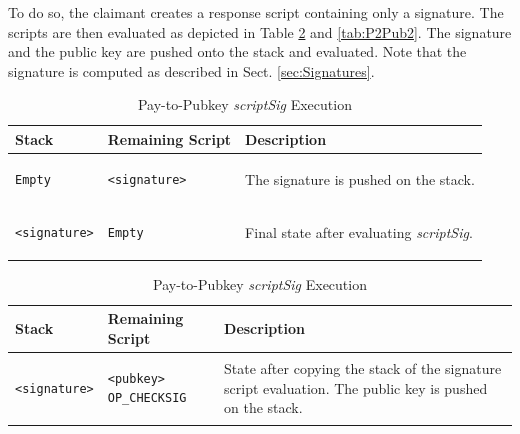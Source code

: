 \noindent
To do so, the claimant creates a response script containing only a signature. The scripts are then evaluated as depicted in Table \ref{tab:P2Pub1} and \ref{tab:P2Pub2}. The signature and the public key are pushed onto the stack and evaluated. Note that the signature is computed as described in Sect. \ref{sec:Signatures}.


\begin{table}
\begin{minipage}{\textwidth}

\centering
\begin{tabular}{| m{95pt} | m{145pt} | m{100pt} |} \hline
\textbf{Stack} & \textbf{Remaining Script} & \textbf{Description} \\ \hline \hline

\vspace{8pt}
\begin{BVerbatim}[fontsize==\relsize{-4}]
Empty
\end{BVerbatim} 
\vspace{4pt}
&
\vspace{8pt}
\begin{BVerbatim}[fontsize==\relsize{-4}]
<signature>
\end{BVerbatim} 
\vspace{4pt}
&
The signature is pushed on the stack.\\ \hline

\vspace{8pt}
\begin{BVerbatim}[fontsize==\relsize{-4}]
<signature>
\end{BVerbatim} 
\vspace{4pt}
&
\vspace{8pt}
\begin{BVerbatim}[fontsize==\relsize{-4}]
Empty
\end{BVerbatim} 
\vspace{4pt}
&
Final state after evaluating \textit{scriptSig}. \\ \hline

\end{tabular}
\vspace{5pt}
\caption{Pay-to-Pubkey \textit{scriptSig} Execution}
\label{tab:P2Pub1}


\begin{tabular}{| m{95pt} | m{145pt} | m{100pt} |}
\hline
\textbf{Stack} & \textbf{Remaining Script} & \textbf{Description} \\ \hline \hline

\vspace{8pt}
\begin{BVerbatim}[fontsize==\relsize{-4}]
<signature>
\end{BVerbatim}
\vspace{4pt}
&
\vspace{8pt}
\begin{BVerbatim}[fontsize==\relsize{-4}]
<pubkey> OP_CHECKSIG
\end{BVerbatim} 
\vspace{4pt}
&
State after copying the stack of the signature script evaluation. The public key is pushed on the stack.\\ \hline	


\end{tabular}
\end{minipage}
\end{table}

